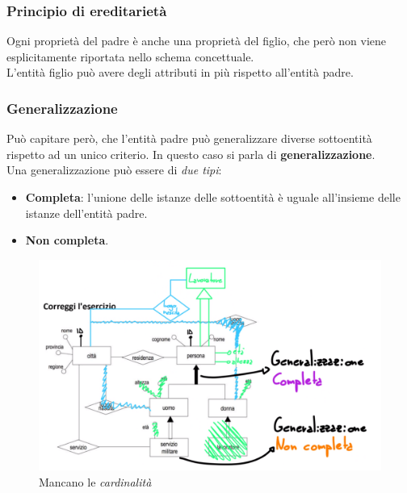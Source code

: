 \documentclass[12pt, a4paper]{article}
\begin{document}
    \subsubsection{Principio di ereditarietà}
    Ogni proprietà del padre è anche una proprietà del figlio, che però non viene esplicitamente riportata nello schema concettuale.
    \\L'entità figlio può avere degli attributi in più rispetto all'entità padre.


    \newpage
    \subsubsection{Generalizzazione}
    Può capitare però, che l'entità padre può generalizzare diverse sottoentità rispetto ad un unico criterio. 
    In questo caso si parla di \textbf{generalizzazione}.
    \\Una generalizzazione può essere di \textit{due tipi}:
    \begin{itemize}
        \item \textbf{Completa}: l'unione delle istanze delle sottoentità è uguale all'insieme delle istanze dell'entità padre.
        \item \textbf{Non completa}.
    \end{itemize}

    \begin{figure}[htbp]
        \centering
        \includegraphics[scale=0.5]{isa.png}
        \caption{Mancano le \textit{cardinalità }}
    \end{figure}




    
\end{document}
